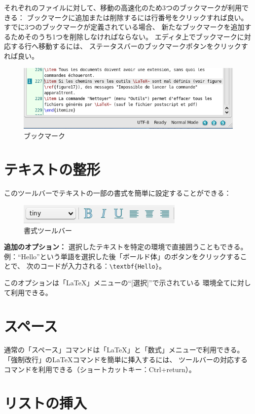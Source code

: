それぞれのファイルに対して、移動の高速化のため3つのブックマークが利用できる：
ブックマークに追加または削除するには行番号をクリックすれば良い。
すでに3つのブックマークが定義されている場合、
新たなブックマークを追加するためそのうち1つを削除しなければならない。
エディタ上でブックマークに対応する行へ移動するには、
ステータスバーのブックマークボタンをクリックすれば良い。

\begin{figure}[H]
  \centering
  \includegraphics[width=.8\linewidth]{doc20.png}
  \caption{ブックマーク}
\end{figure}

\section{テキストの整形}

このツールバーでテキストの一部の書式を簡単に設定することができる：

\begin{figure}[H]
  \centering
  \includegraphics{doc6.png}
  \caption{書式ツールバー}
\end{figure}

\textbf{追加のオプション：}
選択したテキストを特定の環境で直接囲うこともできる。
例：``Hello''という単語を選択した後「ボールド体」のボタンをクリックすることで、
次のコードが入力される：\verb+\textbf{Hello}+。

このオプションは「LaTeX」メニューの``{[}選択{]}''で示されている
環境全てに対して利用できる。

\section{スペース}

通常の「スペース」コマンドは「LaTeX」と「数式」メニューで利用できる。
「強制改行」のLaTeXコマンドを簡単に挿入するには、
ツールバーの対応するコマンドを利用できる（ショートカットキー：Ctrl+return）。

\section{リストの挿入}

